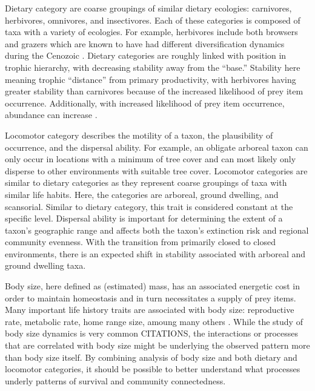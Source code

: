 \documentclass[12pt,letterpaper]{article}
\begin{document}
Dietary category are coarse groupings of similar dietary ecologies: carnivores, herbivores, omnivores, and insectivores. Each of these categories is composed of taxa with a variety of ecologies. For example, herbivores include both browsers and grazers which are known to have had different diversification dynamics during the Cenozoic \citep{Janis2000}. Dietary categories are roughly linked with position in trophic hierarchy, with decreasing stability away from the ``base.'' Stability here meaning trophic ``distance'' from primary productivity, with herbivores having greater stability than carnivores because of the increased likelihood of prey item occurrence. Additionally, with increased likelihood of prey item occurrence, abundance can increase \citep{VanValen1989,Brown1987,Damuth1979,Silva1997,Janis2000}. 

Locomotor category describes the motility of a taxon, the plausibility of occurrence, and the dispersal ability. For example, an obligate arboreal taxon can only occur in locations with a minimum of tree cover and can most likely only disperse to other environments with suitable tree cover. Locomotor categories are similar to dietary categories as they represent coarse groupings of taxa with similar life habits. Here, the categories are arboreal, ground dwelling, and scansorial. Similar to dietary category, this trait is considered constant at the specific level. Dispersal ability is important for determining the extent of a taxon's geographic range \citep{Birand2012,Jablonski2006a,Gaston2009} and affects both the taxon's extinction risk and regional community evenness. With the transition from primarily closed to closed environments, there is an expected shift in stability associated with arboreal and ground dwelling taxa.

Body size, here defined as (estimated) mass, has an associated energetic cost in order to maintain homeostasis and in turn necessitates a supply of prey items. Many important life history traits are associated with body size: reproductive rate, metabolic rate, home range size, amoung many others \cite{Peters1983a,Damuth1979,Brown1987,Smith2004}. While the study of body size dynamics is very common CITATIONS, the interactions or processes that are correlated with body size might be underlying the observed pattern more than body size itself. By combining analysis of body size and both dietary and locomotor categories, it should be possible to better understand what processes underly patterns of survival and community connectedness.
\end{document}
